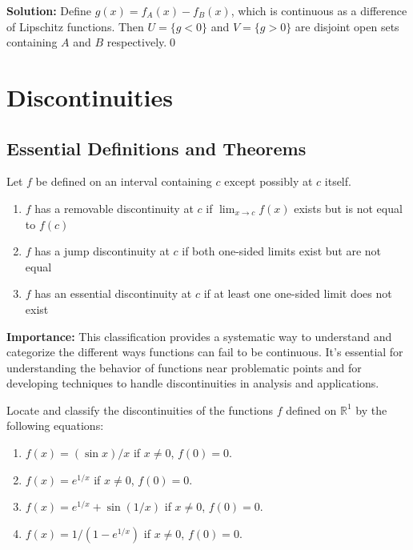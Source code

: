 \bigskip\noindent\textbf{Solution:}
Define $g(x)=f_A(x)-f_B(x)$, which is continuous as a difference of Lipschitz functions. Then $U=\{g<0\}$ and $V=\{g>0\}$ are disjoint open sets containing $A$ and $B$ respectively.\qed

\section{Discontinuities}

\subsection*{Essential Definitions and Theorems}

\begin{definition}
Let $f$ be defined on an interval containing $c$ except possibly at $c$ itself.
\begin{enumerate}
\item $f$ has a removable discontinuity at $c$ if $\lim_{x \to c} f(x)$ exists but is not equal to $f(c)$
\item $f$ has a jump discontinuity at $c$ if both one-sided limits exist but are not equal
\item $f$ has an essential discontinuity at $c$ if at least one one-sided limit does not exist
\end{enumerate}
\end{definition}

\noindent\textbf{Importance:} This classification provides a systematic way to understand and categorize the different ways functions can fail to be continuous. It's essential for understanding the behavior of functions near problematic points and for developing techniques to handle discontinuities in analysis and applications.





\begin{problembox}
\begin{problemstatement}
Locate and classify the discontinuities of the functions $f$ defined on $\mathbb{R}^1$ by the following equations:
\begin{enumerate}[label=(\alph*)]
\item $f(x) = (\sin x)/x$ if $x \neq 0$, $f(0) = 0$.
\item $f(x) = e^{1/x}$ if $x \neq 0$, $f(0) = 0$.
\item $f(x) = e^{1/x} + \sin(1/x)$ if $x \neq 0$, $f(0) = 0$.
\item $f(x) = 1/(1 - e^{1/x})$ if $x \neq 0$, $f(0) = 0$.
\end{enumerate}
\end{problemstatement}
\end{problembox}

